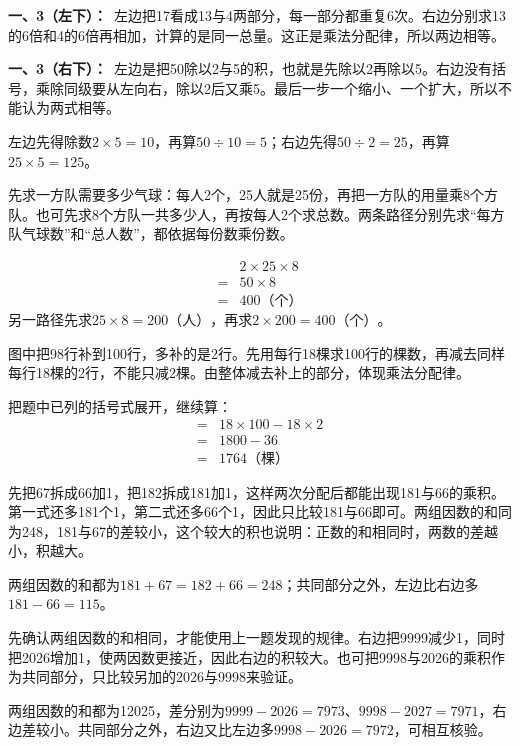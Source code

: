 \documentclass[multi=snippet,border=0pt]{standalone}
\newenvironment{snippet}[3]{\begin{minipage}{#1bp}\color{answerred}\fontsize{#2}{#3}\selectfont\raggedright}{\end{minipage}}
\begin{document}
\begin{snippet}{505}{11.5}{14}\textbf{一、3（左下）：}\ 左边把17看成13与4两部分，每一部分都重复6次。右边分别求13的6倍和4的6倍再相加，计算的是同一总量。这正是乘法分配律，所以两边相等。\end{snippet}
\begin{snippet}{505}{11.5}{14}\textbf{一、3（右下）：}\ 左边是把50除以2与5的积，也就是先除以2再除以5。右边没有括号，乘除同级要从左向右，除以2后又乘5。最后一步一个缩小、一个扩大，所以不能认为两式相等。\par 左边先得除数\(2\times5=10\)，再算\(50\div10=5\)；右边先得\(50\div2=25\)，再算\(25\times5=125\)。\end{snippet}
\begin{snippet}{505}{11.5}{14}先求一方队需要多少气球：每人2个，25人就是25份，再把一方队的用量乘8个方队。也可先求8个方队一共多少人，再按每人2个求总数。两条路径分别先求“每方队气球数”和“总人数”，都依据每份数乘份数。\par \[\begin{aligned}&2\times25\times8\\={}&50\times8\\={}&400\text{（个）}\end{aligned}\]另一路径先求\(25\times8=200\text{（人）}\)，再求\(2\times200=400\text{（个）}\)。\end{snippet}
\begin{snippet}{505}{11.5}{14}图中把98行补到100行，多补的是2行。先用每行18棵求100行的棵数，再减去同样每行18棵的2行，不能只减2棵。由整体减去补上的部分，体现乘法分配律。\par 把题中已列的括号式展开，继续算：\[\begin{aligned}={}&18\times100-18\times2\\={}&1800-36\\={}&1764\text{（棵）}\end{aligned}\]\end{snippet}
\begin{snippet}{505}{11.5}{14}先把67拆成66加1，把182拆成181加1，这样两次分配后都能出现181与66的乘积。第一式还多181个1，第二式还多66个1，因此只比较181与66即可。两组因数的和同为248，181与67的差较小，这个较大的积也说明：正数的和相同时，两数的差越小，积越大。\par 两组因数的和都为\(181+67=182+66=248\)；共同部分之外，左边比右边多\(181-66=115\)。\end{snippet}
\begin{snippet}{505}{11.5}{14}先确认两组因数的和相同，才能使用上一题发现的规律。右边把9999减少1，同时把2026增加1，使两因数更接近，因此右边的积较大。也可把9998与2026的乘积作为共同部分，只比较另加的2026与9998来验证。\par 两组因数的和都为12025，差分别为\(9999-2026=7973\)、\(9998-2027=7971\)，右边差较小。共同部分之外，右边又比左边多\(9998-2026=7972\)，可相互核验。\end{snippet}
\end{document}

